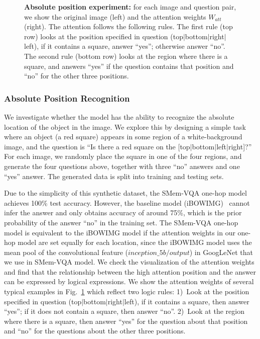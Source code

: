 \begin{figure}[!t]
\vspace{-0.1in}
\caption{\textbf{Absolute position experiment:} for each image and question pair, we show the original image (left) and the attention weights $W_{att}$ (right). 
The attention follows the following rules. The first rule (top row) looks at the position specified in question (top$\mid$bottom$\mid$right$\mid$left), if it contains a square, answer ``yes''; otherwise answer ``no''.
The second rule (bottom row) looks at the region where there is a square, and answers ``yes'' if the question contains that position and ``no'' for the other three positions.}\label{fig:red_square}
\vspace{-0.1in}
\end{figure}


\vspace{-0.1in}
\subsubsection{Absolute Position Recognition}\label{sec:absolute}
We investigate whether the model has the ability to recognize the absolute location of the object in the image. We explore this by designing a simple task where an object (a red square) appears in some region of a white-background image, and the question is ``Is there a red square on the [top$\mid$bottom$\mid$left$\mid$right]?'' For each image, we randomly place the square in one of the four regions, and generate the four questions above, together with three ``no'' answers and one ``yes'' answer. The generated data is split into training and testing sets. 

Due to the simplicity of this synthetic dataset, the SMem-VQA one-hop model achieves 100\% test accuracy. However, the baseline model (iBOWIMG)~\cite{zhou2015simple} cannot infer the answer and only obtains accuracy of around 75\%, which is the prior probability of the answer ``no'' in the training set. The SMem-VQA one-hop model is equivalent to the iBOWIMG model if the attention weights in our one-hop model are set equally for each location, since the iBOWIMG model uses the mean pool of the convolutional feature ($inception\_5b/output$) in GoogLeNet that we use in SMem-VQA model. 
We check the visualization of the attention weights and find that the relationship between the high attention position and the answer can be expressed by logical expressions.
We show the attention weights of several typical examples in Fig.~\ref{fig:red_square} which reflect two logic rules:
1)~Look at the position specified in question (top$\mid$bottom$\mid$right$\mid$left), if it contains a square, then answer ``yes''; if it does not contain a square, then answer ``no''.
2)~Look at the region where there is a square, then answer ``yes'' for the question about that position and ``no'' for the questions about the other three positions.

